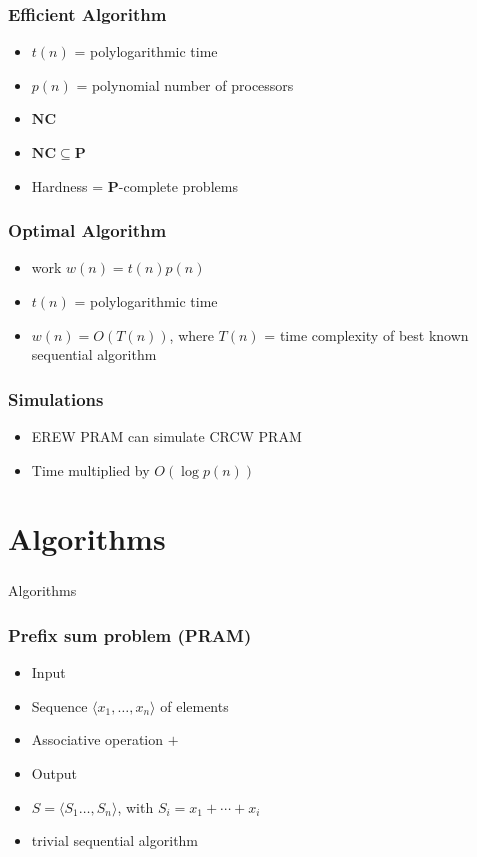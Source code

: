 \documentclass[14pt]{beamer}
\begin{document}
\begin{frame}\frametitle{Efficient Algorithm}
\begin{itemize}
\item
  $t(n)$ = polylogarithmic time
\item
  $p(n)$ = polynomial number of processors
\item
  $\mathbf{NC}$
\item
  $\mathbf{NC}\subseteq \mathbf{P}$
\item
  Hardness = $\mathbf{P}$-complete problems
\end{itemize}
\end{frame}


\begin{frame}\frametitle{Optimal Algorithm}
\begin{itemize}
\item
  \alert{work} $w(n) = t(n) p(n)$
\item
  $t(n)$ = polylogarithmic time
\item
  $w(n) = O(T(n))$, where $T(n)$ = time complexity of \alert{best known}
  sequential algorithm
\end{itemize}
\end{frame}


\begin{frame}\frametitle{Simulations}
\begin{itemize}
\item
  EREW PRAM can simulate CRCW PRAM
\item
  Time multiplied by $O(\log p(n))$
\end{itemize}
\end{frame}




\section{Algorithms}


\begin{frame}\frametitle{}
  \begin{center}
    \Huge
    Algorithms
  \end{center}
\end{frame}

\begin{frame}\frametitle{Prefix sum problem (PRAM)}
  \begin{itemize}
  \item
    Input
  \item
    Sequence $\langle x_{1}, \ldots , x_{n} \rangle$ of elements
  \item
    Associative operation $+$
  \item
    Output
  \item
     $S=\langle S_{1}  \ldots , S_{n} \rangle$, with $S_{i} = x_{1} +
     \cdots + x_{i}$
   \item
     trivial sequential algorithm
  \end{itemize}
\end{frame}
\end{document}
